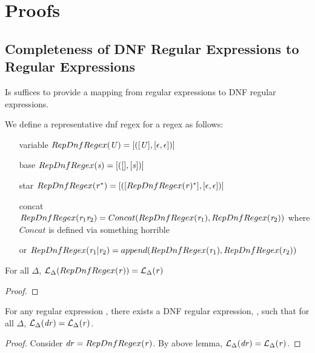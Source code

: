 \section{Proofs}
\subsection{Completeness of DNF Regular Expressions to Regular Expressions}
Is suffices to provide a mapping from regular expressions to DNF regular
expressions.
\begin{definition}[RepDnfRegex]
We define a representative dnf regex for a regex as follows:
\begin{itemize}
\item[variable] $RepDnfRegex(\mathit{U})=[([\mathit{U}],[\epsilon,\epsilon])]$
\item[base] $RepDnfRegex(\mathit{s})=[([],[\mathit{s}])]$
\item[star] $RepDnfRegex(\mathit{r}^*) = [([RepDnfRegex(\mathit{r})^*],[\epsilon,\epsilon])]$
\item[concat] $RepDnfRegex(\mathit{r}_1\mathit{r}_2) = Concat(RepDnfRegex(\mathit{r}_1),RepDnfRegex(\mathit{r}_2))$ where $Concat$ is defined via something horrible
\item[or] $RepDnfRegex(\mathit{r}_1|\mathit{r}_2) = append(RepDnfRegex(\mathit{r}_1),RepDnfRegex(\mathit{r}_2))$
\end{itemize}
\end{definition}

\begin{lemma}
For all $\Delta$, $\mathcal{L}_{\Delta}(RepDnfRegex(\mathit{r})) = \mathcal{L}_{\Delta}(\mathit{r})$
\begin{proof}
\end{proof}
\end{lemma}

\begin{theorem}
For any regular expression \Regex{}, there exists a DNF regular expression, \DNFRegex{},
such that for all $\Delta$, $\mathcal{L}_{\Delta}(\mathit{dr}) = \mathcal{L}_{\Delta}(\mathit{r})$.
\begin{proof}
Consider $\mathit{dr}=RepDnfRegex(\mathit{r})$.  By above lemma, $\mathcal{L}_{\Delta}(\mathit{dr})=\mathcal{L}_{\Delta}(\mathit{r})$.
\end{proof}
\end{theorem}

